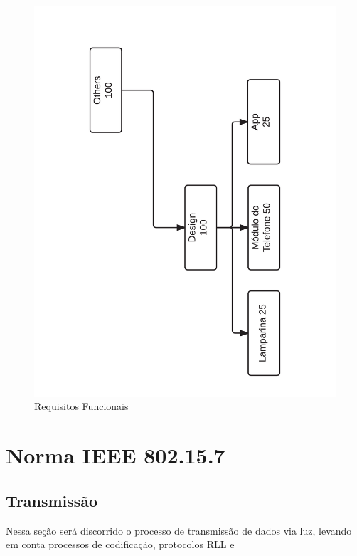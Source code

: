 	\begin{figure}[h!]
		\caption{\label{fig_req3} Requisitos Funcionais }
		\centering
		\includegraphics[width=1.0\textwidth, trim={1cm 1cm 1cm 1cm}, clip]{ReqTree3.pdf}
	\end{figure}
	
	
	\section{Norma IEEE 802.15.7}\label{sec-norma}
	
	\subsection{Transmissão}
	
	Nessa seção será discorrido o processo de transmissão de dados via luz, levando em conta processos de codificação, protocolos RLL e 
		
